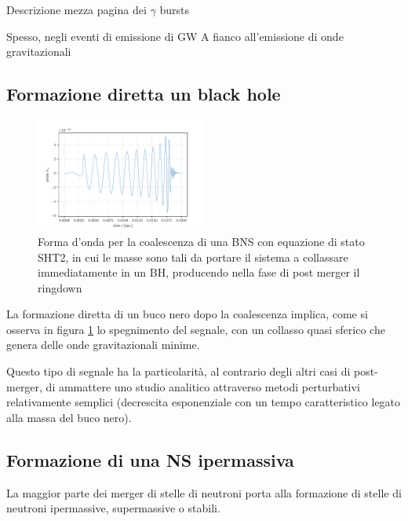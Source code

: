 Descrizione mezza pagina dei $\gamma$ bursts

Spesso, negli eventi di emissione di GW A fianco all'emissione di onde gravitazionali 

\subsection{Formazione diretta un black hole}	
\label{subsection:Diretto_Black_hole}
\begin{figure}
	\vspace{-30pt}
	\begin{center}
		\includegraphics[width=0.5\textwidth]{figures/Capitolo_1/SHT2.2.pdf}
	\end{center}
	\vspace{-10pt}
	\caption{Forma d'onda per la coalescenza di una BNS con equazione di stato SHT2, in cui le masse sono tali da portare il sistema a collassare immediatamente in un BH, producendo nella fase di post merger il ringdown}
	\label{fig:FormaOndaBH}
	\vspace{-20pt}
\end{figure}

La formazione diretta di un buco nero dopo la coalescenza implica, come si osserva in figura \ref{fig:FormaOndaBH} lo spegnimento del segnale, con un collasso quasi sferico che genera delle onde gravitazionali minime\cite{sarin2020evolution}.

Questo tipo di segnale ha la particolarità, al contrario degli altri casi di post-merger, di ammattere uno studio analitico attraverso metodi perturbativi relativamente semplici (decrescita esponenziale con un tempo caratteristico legato alla massa del buco nero)\cite{maggiore2018gravitational}.

\subsection{Formazione di una NS ipermassiva}
\label{subsection:ipermassiva}	
La maggior parte dei merger di stelle di neutroni porta alla formazione di stelle di neutroni ipermassive, supermassive o stabili. 

